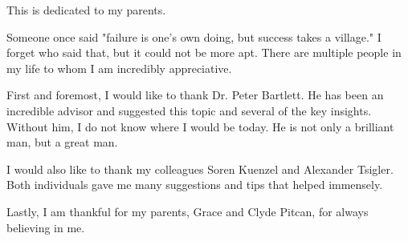 \documentclass{ucbthesis}
\begin{document}
\begin{frontmatter}

\begin{dedication}
\null\vfil
\begin{center}
This is dedicated to my parents.
\end{center}
\vfil\null
\end{dedication}


\tableofcontents
\clearpage
\listoffigures
\clearpage
\listoftables

\begin{acknowledgements}
	
Someone once said "failure is one's own doing, but success takes a village." I forget who said that, but it could not be more apt. There are multiple people in my life to whom I am incredibly appreciative.

First and foremost, I would like to thank Dr. Peter Bartlett. He has been an incredible advisor and suggested this topic and several of the key insights. Without him, I do not know where I would be today. He is not only a brilliant man, but a great man.

I would also like to thank my colleagues Soren Kuenzel and Alexander Tsigler. Both individuals gave me many suggestions and tips that helped immensely.

Lastly, I am thankful for my parents, Grace and Clyde Pitcan, for always believing in me.

\end{acknowledgements}

\end{frontmatter}

\pagestyle{headings}







%
\printbibliography

\end{document}

